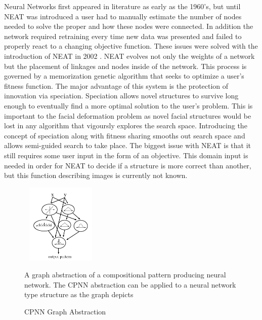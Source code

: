 Neural Networks first appeared in literature as early as the 1960's, but until NEAT was introduced a user had to manually 
estimate the number of nodes needed to solve the proper and how these nodes were connected. In addition the network required
retraining every time new data was presented and failed to properly react to a changing objective function. These issues were
solved with the introduction of NEAT in 2002 \cite{stanley2002evolving}. NEAT evolves not only the weights of a network but
the placement of linkages and nodes inside of the network. This process is governed by a memorization genetic algorithm that 
seeks to optimize a user's fitness function. The major advantage of this system is the protection of innovation via speciation.
Speciation allows novel structures to survive long enough to eventually find a more optimal solution to the user's problem. 
This is important to the facial deformation problem as novel facial structures would be lost in any algorithm that vigoursly
explores the search space. Introducing the concept of speciation along with fitness sharing smooths out search space and 
allows semi-guided search to take place. The biggest issue with NEAT is that it still requires some user input in the form
of an objective. This domain input is needed in order for NEAT to decide if a structure is more correct than another, but 
this function describing images is currently not known. 

\begin{figure}
 \centering
 \label{fig:paper:CPNN}
 \includegraphics[height=1.5in,width=1.5in]{../../rec/paper/CPNN.png}
 \caption{CPNN Graph Abstraction} A graph abstraction of a compositional pattern producing neural network. The CPNN abstraction
 can be applied to a neural network type structure as the graph depicts \cite{stanley2002evolving}
\end{figure}

